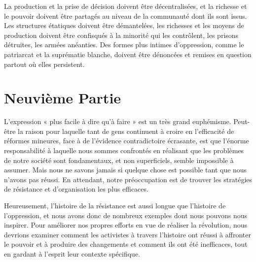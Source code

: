 La production et la prise de décision doivent être décentralisées, et la richesse et le pouvoir doivent être partagés au niveau de la communauté dont ils sont issus. Les structures étatiques doivent être démantelées, les richesses et les moyens de production doivent être confisqués à la minorité qui les contrôlent, les prisons détruites, les armées anéanties. Des formes plus intimes d'oppression, comme le patriarcat et la suprématie blanche, doivent être dénoncées et remises en question partout où elles persistent.

\chapter*{\textbf{Neuvième Partie}}

L'expression « plus facile à dire qu'à faire » est un très grand euphémisme. Peut-être la raison pour laquelle tant de gens continuent à croire en l'efficacité de réformes mineures, face à de l’évidence contradictoire écrasante, est que l'énorme responsabilité à laquelle nous sommes confrontés en réalisant que les problèmes de notre société sont fondamentaux, et non superficiels, semble impossible à assumer. Mais nous ne savons jamais si quelque chose est possible tant que nous n'avons pas réussi. En attendant, notre préoccupation est de trouver les stratégies de résistance et d'organisation les plus efficaces.

Heureusement, l'histoire de la résistance est aussi longue que l'histoire de l'oppression, et nous avons donc de nombreux exemples dont nous pouvons nous inspirer. Pour améliorer nos propres efforts en vue de réaliser la révolution, nous devrions examiner comment les activistes à travers l'histoire ont réussi à affronter le pouvoir et à produire des changements et comment ils ont été inefficaces, tout en gardant à l'esprit leur contexte spécifique.

